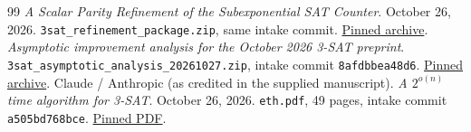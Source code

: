 \documentclass[11pt,letterpaper]{article}
\numberwithin{equation}{section}
\theoremstyle{definition}\newtheorem{definition}[theorem]{Definition}
\theoremstyle{remark}\newtheorem{remark}[theorem]{Remark}
\newcommand{\incoming}{https://github.com/VladimirReshetnikov/ProveIt/blob/aa6933442eb936962de79ba6d321cd0391c450bd/docs/incoming/}
\begin{document}
\begin{thebibliography}{99}
 \emph{A Scalar Parity Refinement of the Subexponential SAT Counter}. October 26, 2026. \texttt{3sat\_refinement\_package.zip}, same intake commit. \href{\incoming 3sat_refinement_package.zip}{Pinned archive}.
 \emph{Asymptotic improvement analysis for the October 2026 3-SAT preprint}. \texttt{3sat\_asymptotic\_analysis\_20261027.zip}, intake commit \texttt{8afdbbea48d6}. \href{\incoming 3sat_asymptotic_analysis_20261027.zip}{Pinned archive}.
 Claude / Anthropic (as credited in the supplied manuscript). \emph{A $2^{o(n)}$ time algorithm for 3-SAT}. October 26, 2026. \texttt{eth.pdf}, 49 pages, intake commit \texttt{a505bd768bce}. \href{\incoming eth.pdf}{Pinned PDF}.
\end{thebibliography}
\end{document}
